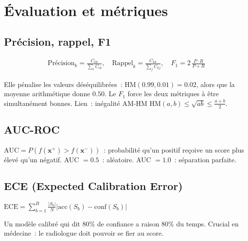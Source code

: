 \documentclass[11pt,a4paper]{article}
\begin{document}
\section{\'Evaluation et m\'etriques}

\subsection{Pr\'ecision, rappel, F1}

\begin{align}
  \text{Pr\'ecision}_k = \frac{C_{kk}}{\sum_i C_{ik}}, \quad
  \text{Rappel}_k = \frac{C_{kk}}{\sum_j C_{kj}}, \quad
  F_1 = 2\,\frac{P \cdot R}{P + R}
\end{align}

\begin{intubox}
Elle p\'enalise les valeurs d\'es\'equilibr\'ees~: $\text{HM}(0.99, 0.01) = 0.02$, alors que la moyenne arithm\'etique donne $0.50$. Le $F_1$ force les deux m\'etriques \`a \^etre simultan\'ement bonnes. Lien~: in\'egalit\'e AM-HM $\text{HM}(a,b) \leq \sqrt{ab} \leq \frac{a+b}{2}$.
\end{intubox}

\subsection{AUC-ROC}

\begin{intubox}
$\text{AUC} = P(f(\mathbf{x}^+) > f(\mathbf{x}^-))$~: probabilit\'e qu'un positif re\c{c}oive un score plus \'elev\'e qu'un n\'egatif. AUC $= 0.5$~: al\'eatoire. AUC $= 1.0$~: s\'eparation parfaite.
\end{intubox}

\subsection{ECE (Expected Calibration Error)}

$\text{ECE} = \sum_{b=1}^{B} \frac{|S_b|}{N} |\text{acc}(S_b) - \text{conf}(S_b)|$

\begin{intubox}[Calibration = honn\^etet\'e du mod\`ele]
Un mod\`ele calibr\'e qui dit \og{}80\% de confiance\fg{} a raison 80\% du temps. Crucial en m\'edecine~: le radiologue doit pouvoir se fier au score.
\end{intubox}
\end{document}
